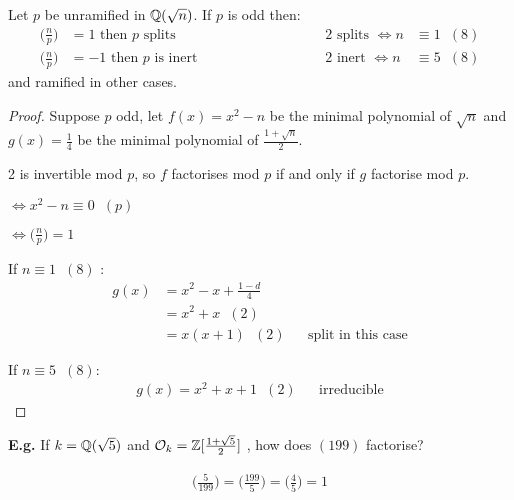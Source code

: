 \documentclass[11pt]{article}
\begin{document}
 
 \begin{theorem}
	 Let $p$ be unramified in $\mathbb{Q}(\sqrt{n})$.
	 If $p$ is odd then:
\begin{align*}
	\Big(\frac{n}{p}\Big)  &= 1 \text{ then $p$ splits}  \hspace{100pt}& 2 \text{ splits } \iff n &\equiv 1 \hspace{7pt} (8)\\
	\Big(\frac{n}{p}\Big)  &= -1 \text{ then $p$ is inert}  \hspace{100pt}& 2 \text{ inert } \iff n &\equiv 5 \hspace{7pt} (8)
\end{align*}
and ramified in other cases.
 \end{theorem}

\begin{proof}
	Suppose $p$ odd, let $f(x) = x^2 - n $ be the minimal polynomial of $\sqrt{n}$ and $g(x)= \frac{1}{4} $ be the minimal polynomial of $\frac{1+\sqrt{n}}{2}$.

	2 is invertible mod $p$, so $f$ factorises mod $p$ if and only if $g$ factorise mod $p$.

	$\iff x^2 - n \equiv 0 \hspace{7pt} (p)$
	\spa

	$\iff \Big(\frac{n}{p}\Big) = 1$
\spac

	If $n \equiv 1 \hspace{7pt} (8)$ :
	\begin{align*}
		g(x) &= x^2 - x + \frac{1-d}4\\
		&= x^2+ x \hspace{7pt} (2)\\
		& = x(x+1) \hspace{7pt}(2) &&\text{split in this case}
	\end{align*}
\spac

	If $n \equiv 5 \hspace{7pt} (8) $:
	\begin{align*}
		g(x) = x^2 +x+1 \hspace{7pt} (2)&& \text{irreducible}
	\end{align*}
\end{proof}
\textbf{E.g.} If $k = \mathbb{Q}(\sqrt{5})$ and $\mathcal{O}_k = \mathbb{Z}[\frac{1+\sqrt5}2]$ , how does $(199)$ factorise?

\begin{align*}
	\Big( \frac{5}{199} \Big) = \Big( \frac{199}5 \Big) = \Big(\frac{4}{5}\Big) = 1
\end{align*}
 
\end{document}
